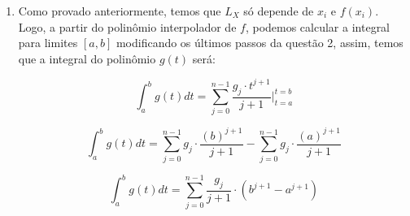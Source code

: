 \documentclass[12pt]{article}
\begin{document}
\begin{enumerate}[1.]
    \bigskip\bigskip
    \item Como provado anteriormente, temos que $L_X$ só depende de $x_i$ e $f(x_i)$.
    Logo, a partir do polinômio interpolador de $f$, podemos calcular a integral para limites $[a,b]$ modificando os últimos passos da questão 2, assim, temos que a integral do polinômio $g(t)$ será:
    
     $$\int_{a}^{b} g(t)dt = \sum_{j=0}^{n-1} \frac{g_j \cdot t^{j+1}}{j+1} \bigg|_{t=a}^{t=b}  $$
    
    $$\int_{a}^{b} g(t)dt  =  \sum_{j=0}^{n-1} g_j \cdot \frac{(b)^{j+1}}{j+1} - \sum_{j=0}^{n-1} g_j \cdot \frac{(a)^{j+1}}{j+1} $$
    
    
    $$\int_{a}^{b} g(t)dt = \sum_{j=0}^{n-1} \frac{g_j}{j+1} \cdot (b^{j+1} - a^{j+1} ) $$
    
    \bigskip\bigskip
    

    
\end{enumerate}
\end{document}
